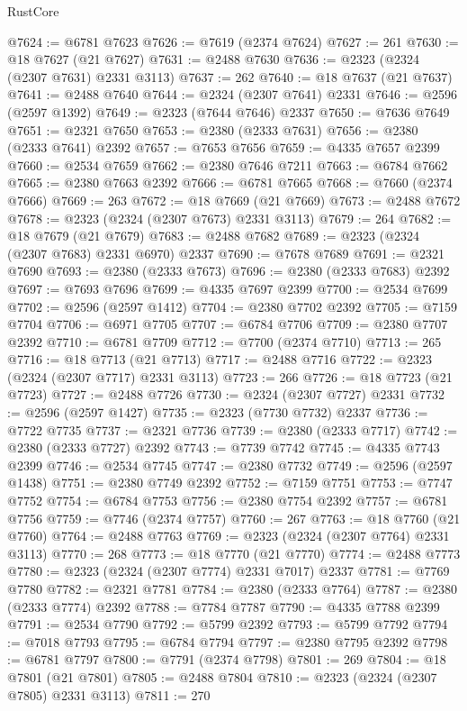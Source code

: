 \begin{lexlean}{RustCore}
\begin{coremodule}
@7624 := @6781 @7623
@7626 := @7619 (@2374 @7624)
@7627 := 261
@7630 := @18 @7627 (@21 @7627)
@7631 := @2488 @7630
@7636 := @2323 (@2324 (@2307 @7631) @2331 @3113)
@7637 := 262
@7640 := @18 @7637 (@21 @7637)
@7641 := @2488 @7640
@7644 := @2324 (@2307 @7641) @2331
@7646 := @2596 (@2597 @1392)
@7649 := @2323 (@7644 @7646) @2337
@7650 := @7636 @7649
@7651 := @2321 @7650
@7653 := @2380 (@2333 @7631)
@7656 := @2380 (@2333 @7641) @2392
@7657 := @7653 @7656
@7659 := @4335 @7657 @2399
@7660 := @2534 @7659
@7662 := @2380 @7646 @7211
@7663 := @6784 @7662
@7665 := @2380 @7663 @2392
@7666 := @6781 @7665
@7668 := @7660 (@2374 @7666)
@7669 := 263
@7672 := @18 @7669 (@21 @7669)
@7673 := @2488 @7672
@7678 := @2323 (@2324 (@2307 @7673) @2331 @3113)
@7679 := 264
@7682 := @18 @7679 (@21 @7679)
@7683 := @2488 @7682
@7689 := @2323 (@2324 (@2307 @7683) @2331 @6970) @2337
@7690 := @7678 @7689
@7691 := @2321 @7690
@7693 := @2380 (@2333 @7673)
@7696 := @2380 (@2333 @7683) @2392
@7697 := @7693 @7696
@7699 := @4335 @7697 @2399
@7700 := @2534 @7699
@7702 := @2596 (@2597 @1412)
@7704 := @2380 @7702 @2392
@7705 := @7159 @7704
@7706 := @6971 @7705
@7707 := @6784 @7706
@7709 := @2380 @7707 @2392
@7710 := @6781 @7709
@7712 := @7700 (@2374 @7710)
@7713 := 265
@7716 := @18 @7713 (@21 @7713)
@7717 := @2488 @7716
@7722 := @2323 (@2324 (@2307 @7717) @2331 @3113)
@7723 := 266
@7726 := @18 @7723 (@21 @7723)
@7727 := @2488 @7726
@7730 := @2324 (@2307 @7727) @2331
@7732 := @2596 (@2597 @1427)
@7735 := @2323 (@7730 @7732) @2337
@7736 := @7722 @7735
@7737 := @2321 @7736
@7739 := @2380 (@2333 @7717)
@7742 := @2380 (@2333 @7727) @2392
@7743 := @7739 @7742
@7745 := @4335 @7743 @2399
@7746 := @2534 @7745
@7747 := @2380 @7732
@7749 := @2596 (@2597 @1438)
@7751 := @2380 @7749 @2392
@7752 := @7159 @7751
@7753 := @7747 @7752
@7754 := @6784 @7753
@7756 := @2380 @7754 @2392
@7757 := @6781 @7756
@7759 := @7746 (@2374 @7757)
@7760 := 267
@7763 := @18 @7760 (@21 @7760)
@7764 := @2488 @7763
@7769 := @2323 (@2324 (@2307 @7764) @2331 @3113)
@7770 := 268
@7773 := @18 @7770 (@21 @7770)
@7774 := @2488 @7773
@7780 := @2323 (@2324 (@2307 @7774) @2331 @7017) @2337
@7781 := @7769 @7780
@7782 := @2321 @7781
@7784 := @2380 (@2333 @7764)
@7787 := @2380 (@2333 @7774) @2392
@7788 := @7784 @7787
@7790 := @4335 @7788 @2399
@7791 := @2534 @7790
@7792 := @5799 @2392
@7793 := @5799 @7792
@7794 := @7018 @7793
@7795 := @6784 @7794
@7797 := @2380 @7795 @2392
@7798 := @6781 @7797
@7800 := @7791 (@2374 @7798)
@7801 := 269
@7804 := @18 @7801 (@21 @7801)
@7805 := @2488 @7804
@7810 := @2323 (@2324 (@2307 @7805) @2331 @3113)
@7811 := 270

\end{coremodule}
\end{lexlean}
